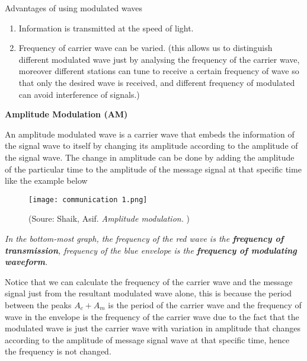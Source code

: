 \documentclass{article}
\begin{document}
\begin{flushleft}
\item Advantages of using modulated waves
\end{flushleft}
\begin{enumerate}
    \item Information is transmitted at the speed of light.
    \item Frequency of carrier wave can be varied. (this allows us to distinguish different modulated wave just by analysing the frequency of the carrier wave, moreover different stations can tune to receive a certain frequency of wave so that only the desired wave is received, and different frequency of modulated can avoid interference of signals.)
\end{enumerate}

\begin{flushleft}
\item \textbf{Amplitude Modulation (AM)}
\end{flushleft}
An amplitude modulated wave is a carrier wave that embeds the information of the signal wave to itself by changing its amplitude according to the amplitude of the signal wave. The change in amplitude can be done by adding the amplitude of the particular time to the amplitude of the message signal at that specific time like the example below
\begin{figure}[H]
    \centering
    \captionsetup{justification=centering,margin=2cm}
    \texttt{[image: communication 1.png]}
    \caption*{(Soure: Shaik, Asif. \textit{Amplitude modulation.} )}
\end{figure}

\textit{In the bottom-most graph, the frequency of the red wave is the \textbf{frequency of transmission}, frequency of the blue envelope is the \textbf{frequency of modulating waveform}.}

Notice that we can calculate the frequency of the carrier wave and the message signal just from the resultant modulated wave alone, this is because the period between the peaks $A_c+A_m$ is the period of the carrier wave and the frequency of wave in the envelope is the frequency of the carrier wave due to the fact that the modulated wave is just the carrier wave with variation in amplitude that changes according to the amplitude of message signal wave at that specific time, hence the frequency is not changed.
\end{document}
